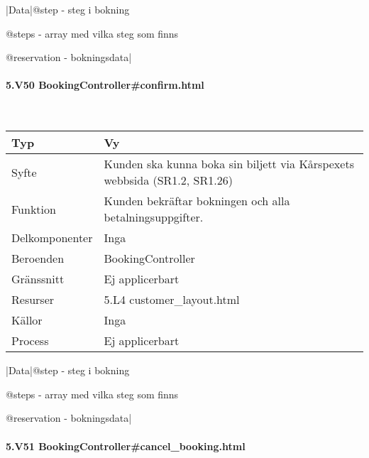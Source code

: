 \documentclass[a4paper, twoside, 11pt, titlepage]{article}
\begin{document}
			|Data|@step - steg i bokning

			@steps - array med vilka steg som finns

			@reservation - bokningsdata|

			\paragraph{5.V50 BookingController\#confirm.html}\

			\begin {table} [ht] \begin{tabular} {  p{3.5cm} p{9.6cm} }
				\hline
				Typ & Vy  \\
				\hline
				Syfte & Kunden ska kunna boka sin biljett via Kårspexets webbsida (SR1.2, SR1.26)  \\
				\hline
				Funktion & Kunden bekräftar bokningen och alla betalningsuppgifter.  \\
				\hline
				Delkomponenter & Inga  \\
				\hline
				Beroenden & BookingController  \\
				\hline
				Gränssnitt & Ej applicerbart  \\
				\hline
				Resurser & 5.L4 customer\_layout.html   \\
				\hline
				Källor & Inga  \\
				\hline
				Process & Ej applicerbart  \\
				\hline
			\end{tabular} \end{table} \FloatBarrier
			\vspace{6mm}

			|Data|@step - steg i bokning

			@steps - array med vilka steg som finns

			@reservation - bokningsdata|

			\paragraph{5.V51 BookingController\#cancel\_booking.html}\
\end{document}
